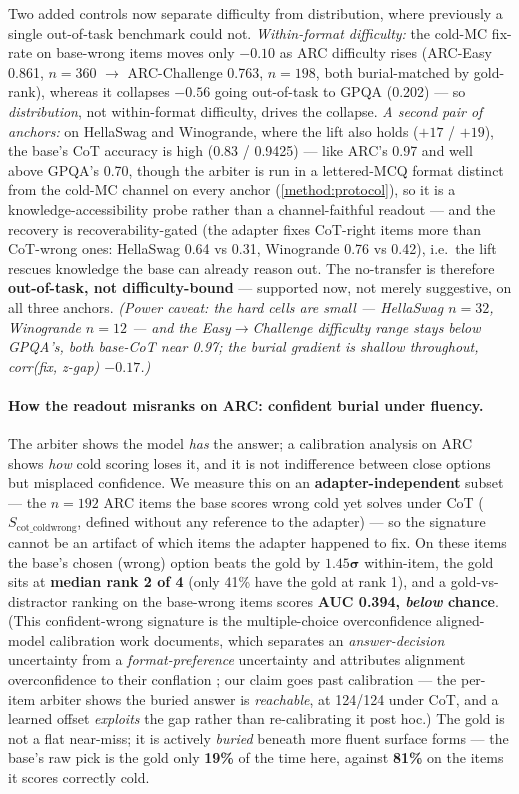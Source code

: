 Two added controls now separate difficulty from distribution, where previously a
single out-of-task benchmark could not. \emph{Within-format difficulty:} the cold-MC
fix-rate on base-wrong items moves only $\mathbf{-0.10}$ as ARC difficulty rises
(ARC-Easy 0.861, $n{=}360$ $\rightarrow$ ARC-Challenge 0.763, $n{=}198$, both
burial-matched by gold-rank), whereas it collapses $\mathbf{-0.56}$ going
out-of-task to GPQA (0.202) --- so \emph{distribution}, not within-format
difficulty, drives the collapse. \emph{A second pair of anchors:} on HellaSwag and
Winogrande, where the lift also holds ($+17$ / $+19$), the base's CoT accuracy is
high (0.83 / 0.9425) --- like ARC's 0.97 and well above GPQA's 0.70, though the
arbiter is run in a lettered-MCQ format distinct from the cold-MC channel on every
anchor (\cref{method:protocol}), so it is a knowledge-accessibility probe rather
than a channel-faithful readout --- and the
recovery is recoverability-gated (the adapter fixes CoT-right items more than
CoT-wrong ones: HellaSwag 0.64 vs 0.31, Winogrande 0.76 vs 0.42), i.e.\ the lift
rescues knowledge the base can already reason out. The no-transfer is therefore
\textbf{out-of-task, not difficulty-bound} --- supported now, not merely
suggestive, on all three anchors. \emph{(Power caveat: the hard cells are small ---
HellaSwag $n{=}32$, Winogrande $n{=}12$ --- and the Easy${\rightarrow}$Challenge
difficulty range stays below GPQA's, both base-CoT near 0.97; the burial gradient is
shallow throughout, corr(fix, z-gap) $-0.17$.)}

\paragraph{How the readout misranks on ARC: confident burial under fluency.}
The arbiter shows the model \emph{has} the answer; a calibration analysis on ARC
shows \emph{how} cold scoring loses it, and it is not indifference between close
options but misplaced confidence. We measure this on an \textbf{adapter-independent}
subset --- the $n{=}192$ ARC items the base scores wrong cold yet solves under CoT
($S_{\mathrm{cot\_coldwrong}}$, defined without any reference to the adapter) --- so
the signature cannot be an artifact of which items the adapter happened to fix. On
these items the base's chosen (wrong) option beats the gold by $\mathbf{1.45\sigma}$
within-item, the gold sits at \textbf{median rank 2 of 4} (only 41\% have the gold
at rank 1), and a gold-vs-distractor ranking on the base-wrong items scores
\textbf{AUC 0.394, \emph{below} chance}. (This confident-wrong signature is the
multiple-choice overconfidence aligned-model calibration work documents, which
separates an \emph{answer-decision} uncertainty from a \emph{format-preference}
uncertainty and attributes alignment overconfidence to their conflation
\citep{AlignedMCCalibration}; our claim goes past calibration --- the per-item
arbiter shows the buried answer is \emph{reachable}, at 124/124 under CoT, and a
learned offset \emph{exploits} the gap rather than re-calibrating it post hoc.) The
gold is not a flat near-miss; it is actively \emph{buried} beneath more fluent
surface forms --- the base's raw pick is the gold only \textbf{19\%} of the time
here, against \textbf{81\%} on the items it scores correctly cold.

